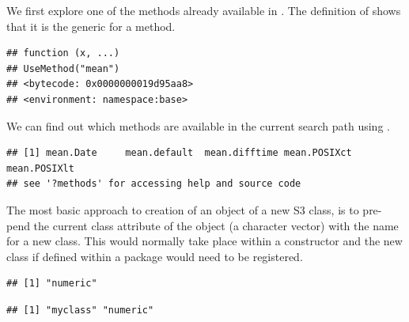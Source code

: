 \documentclass[krantz2]{krantz}\usepackage{knitr}%
\begin{document}
We first explore one of the methods already available in \Rlang. The definition of  shows that it is the generic for a method.

\begin{knitrout}\footnotesize
{}\color{fgcolor}\begin{kframe}
\begin{alltt}
\end{alltt}
\begin{verbatim}
## function (x, ...) 
## UseMethod("mean")
## <bytecode: 0x0000000019d95aa8>
## <environment: namespace:base>
\end{verbatim}
\end{kframe}
\end{knitrout}

We can find out which methods are available in the current search path using .
\begin{knitrout}\footnotesize
{}\color{fgcolor}\begin{kframe}
\begin{alltt}
\end{alltt}
\begin{verbatim}
## [1] mean.Date     mean.default  mean.difftime mean.POSIXct  mean.POSIXlt 
## see '?methods' for accessing help and source code
\end{verbatim}
\end{kframe}
\end{knitrout}

The most basic approach to creation of an object of a new S3 class, is to pre-pend the current class attribute of the object (a character vector) with the name for a new class. This would normally take place within a constructor and the new class if defined within a package would need to be registered.

\begin{knitrout}\footnotesize
{}\color{fgcolor}\begin{kframe}
\begin{alltt}
 \hlkwb{<-} 
\end{alltt}
\begin{verbatim}
## [1] "numeric"
\end{verbatim}
\begin{alltt}
 \hlkwb{<-} \hlstd{(}\hlstd{,} 
\end{alltt}
\begin{verbatim}
## [1] "myclass" "numeric"
\end{verbatim}
\end{kframe}
\end{knitrout}
\end{document}

